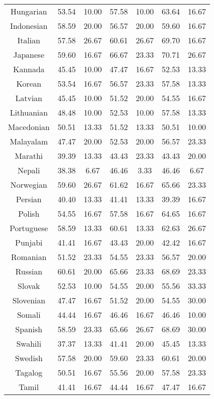 \begin{table*}[]
\begin{tabular}{c|cc|cc|cc}
Hungarian & 53.54 & 10.00 & 57.58 & 10.00 & 63.64 & 16.67 \\
Indonesian & 58.59 & 20.00 & 56.57 & 20.00 & 59.60 & 16.67 \\
Italian & 57.58 & 26.67 & 60.61 & 26.67 & 69.70 & 16.67 \\
Japanese & 59.60 & 16.67 & 66.67 & 23.33 & 70.71 & 26.67 \\
Kannada & 45.45 & 10.00 & 47.47 & 16.67 & 52.53 & 13.33 \\
Korean & 53.54 & 16.67 & 56.57 & 23.33 & 57.58 & 13.33 \\
Latvian & 45.45 & 10.00 & 51.52 & 20.00 & 54.55 & 16.67 \\
Lithuanian & 48.48 & 10.00 & 52.53 & 10.00 & 57.58 & 13.33 \\
Macedonian & 50.51 & 13.33 & 51.52 & 13.33 & 50.51 & 10.00 \\
Malayalam & 47.47 & 20.00 & 52.53 & 20.00 & 56.57 & 23.33 \\
Marathi & 39.39 & 13.33 & 43.43 & 23.33 & 43.43 & 20.00 \\
Nepali & 38.38 & 6.67 & 46.46 & 3.33 & 46.46 & 6.67 \\
Norwegian & 59.60 & 26.67 & 61.62 & 16.67 & 65.66 & 23.33 \\
Persian & 40.40 & 13.33 & 41.41 & 13.33 & 39.39 & 16.67 \\
Polish & 54.55 & 16.67 & 57.58 & 16.67 & 64.65 & 16.67 \\
Portuguese & 58.59 & 13.33 & 60.61 & 13.33 & 62.63 & 26.67 \\
Punjabi & 41.41 & 16.67 & 43.43 & 20.00 & 42.42 & 16.67 \\
Romanian & 51.52 & 23.33 & 54.55 & 23.33 & 56.57 & 20.00 \\
Russian & 60.61 & 20.00 & 65.66 & 23.33 & 68.69 & 23.33 \\
Slovak & 52.53 & 10.00 & 54.55 & 20.00 & 55.56 & 33.33 \\
Slovenian & 47.47 & 16.67 & 51.52 & 20.00 & 54.55 & 30.00 \\
Somali & 44.44 & 16.67 & 46.46 & 16.67 & 46.46 & 10.00 \\
Spanish & 58.59 & 23.33 & 65.66 & 26.67 & 68.69 & 30.00 \\
Swahili & 37.37 & 13.33 & 41.41 & 20.00 & 45.45 & 13.33 \\
Swedish & 57.58 & 20.00 & 59.60 & 23.33 & 60.61 & 20.00 \\
Tagalog & 50.51 & 16.67 & 55.56 & 20.00 & 57.58 & 23.33 \\
Tamil & 41.41 & 16.67 & 44.44 & 16.67 & 47.47 & 16.67 \\

\end{tabular}
\end{table*}
